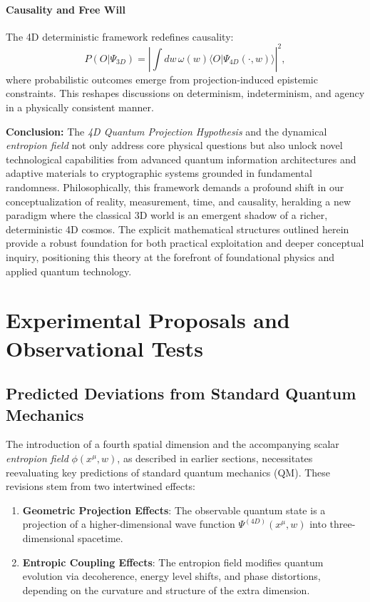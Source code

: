 \documentclass[12pt]{article}
\begin{document}
\paragraph{Causality and Free Will}

The 4D deterministic framework redefines causality:
\begin{equation}
P(O|\Psi_{3D}) = \left|\int dw \, \omega(w) \langle O | \Psi_{4D}(\cdot, w) \rangle \right|^2,
\label{eq:probabilistic_causality}
\end{equation}
where probabilistic outcomes emerge from projection-induced epistemic constraints. This reshapes discussions on determinism, indeterminism, and agency in a physically consistent manner.

\vspace{1em}
\noindent\textbf{Conclusion:} The \emph{4D Quantum Projection Hypothesis} and the dynamical \emph{entropion field} not only address core physical questions but also unlock novel technological capabilities from advanced quantum information architectures and adaptive materials to cryptographic systems grounded in fundamental randomness. Philosophically, this framework demands a profound shift in our conceptualization of reality, measurement, time, and causality, heralding a new paradigm where the classical 3D world is an emergent shadow of a richer, deterministic 4D cosmos. The explicit mathematical structures outlined herein provide a robust foundation for both practical exploitation and deeper conceptual inquiry, positioning this theory at the forefront of foundational physics and applied quantum technology.



\section{Experimental Proposals and Observational Tests}
\subsection{Predicted Deviations from Standard Quantum Mechanics}

The introduction of a fourth spatial dimension and the accompanying scalar \emph{entropion field} \(\phi(x^\mu, w)\), as described in earlier sections, necessitates reevaluating key predictions of standard quantum mechanics (QM). These revisions stem from two intertwined effects:

\begin{enumerate}
    \item \textbf{Geometric Projection Effects}: The observable quantum state is a projection of a higher-dimensional wave function \( \Psi^{(4D)}(x^\mu, w) \) into three-dimensional spacetime.
    \item \textbf{Entropic Coupling Effects}: The entropion field modifies quantum evolution via decoherence, energy level shifts, and phase distortions, depending on the curvature and structure of the extra dimension.
\end{enumerate}
\end{document}
